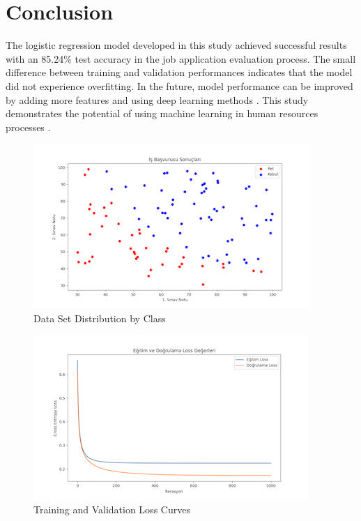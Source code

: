 \documentclass[conference]{IEEEtran}
\begin{document}
\section{Conclusion}
The logistic regression model developed in this study achieved successful
results with an 85.24\% test accuracy in the job application evaluation process.
The small difference between training and validation performances indicates that
the model did not experience overfitting. In the future, model performance can
be improved by adding more features and using deep learning methods
\cite{kumar2023}. This study demonstrates the potential of using machine
learning in human resources processes \cite{zhang2023}.

\newpage

\begin{figure}
\centering
\includegraphics{images/data.png}
\caption{Data Set Distribution by Class}
\label{fig:data_distribution}
\end{figure}

\begin{figure}
\centering
\includegraphics{images/loss_curves.png}
\caption{Training and Validation Loss Curves}
\label{fig:loss_curves}
\end{figure}
\end{document}
